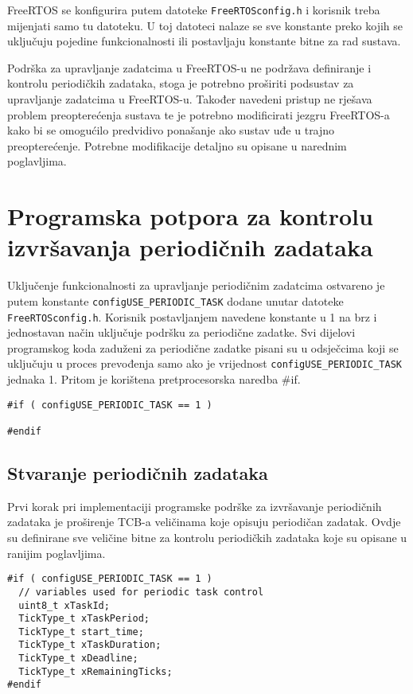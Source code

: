 \documentclass[../zavrsni.tex]{subfiles}
\begin{document}
FreeRTOS se konfigurira putem datoteke \texttt{FreeRTOSconfig.h} i korisnik treba mijenjati samo tu datoteku. U toj datoteci nalaze se 
sve konstante preko kojih se uključuju pojedine funkcionalnosti ili postavljaju konstante bitne za rad sustava.  

Podrška za upravljanje zadatcima u FreeRTOS-u ne podržava definiranje i kontrolu periodičkih zadataka, stoga je potrebno proširiti podsustav 
za upravljanje zadatcima u FreeRTOS-u.
Također navedeni pristup ne rješava problem preopterećenja sustava te je potrebno modificirati jezgru FreeRTOS-a kako bi se omogućilo 
predvidivo ponašanje ako sustav uđe u trajno preopterećenje. Potrebne modifikacije detaljno su opisane u narednim poglavljima.

\section{Programska potpora za kontrolu izvršavanja periodičnih zadataka}

Uključenje funkcionalnosti za upravljanje periodičnim zadatcima ostvareno je putem konstante \texttt{configUSE\_PERIODIC\_TASK} dodane unutar 
datoteke \texttt{FreeRTOSconfig.h}. Korisnik postavljanjem navedene konstante u 1 na brz i jednostavan način uključuje podršku za periodične zadatke.
Svi dijelovi programskog koda zaduženi za periodične zadatke pisani su u odsječcima koji se uključuju u proces prevođenja samo ako je vrijednost 
\texttt{configUSE\_PERIODIC\_TASK} jednaka 1. Pritom je korištena pretprocesorska naredba \#if. 
\begin{lstlisting}[style=CStyle,caption={Pretprocesorska naredba za uključenje periodičnih zadataka},captionpos=b]
#if ( configUSE_PERIODIC_TASK == 1 )

#endif
\end{lstlisting}

\subsection{Stvaranje periodičnih zadataka}

Prvi korak pri implementaciji programske podrške za izvršavanje periodičnih zadataka je proširenje TCB-a veličinama koje opisuju 
periodičan zadatak. Ovdje su definirane sve veličine bitne za kontrolu periodičkih zadataka koje su opisane u ranijim poglavljima.

\begin{lstlisting}[style=CStyle,caption={Varijable dodane u strukturu za kontrolu zadataka},captionpos=b]
#if ( configUSE_PERIODIC_TASK == 1 )
  // variables used for periodic task control    
  uint8_t xTaskId;
  TickType_t xTaskPeriod;
  TickType_t start_time;
  TickType_t xTaskDuration;
  TickType_t xDeadline;
  TickType_t xRemainingTicks;
#endif
\end{lstlisting}
\end{document}
